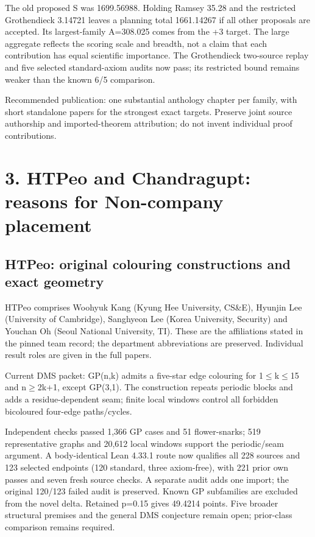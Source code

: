 \documentclass[10pt,a4paper]{article}
\begin{document}
The old proposed S was 1699.56988. Holding Ramsey 35.28 and the restricted Grothendieck 3.14721 leaves a planning total 1661.14267 if all other proposals are accepted. Its largest-family A=308.025 comes from the +3 target. The large aggregate reflects the scoring scale and breadth, not a claim that each contribution has equal scientific importance. The Grothendieck two-source replay and five selected standard-axiom audits now pass; its restricted bound remains weaker than the known 6/5 comparison.

{\small Recommended publication: one substantial anthology chapter per family, with short standalone papers for the strongest exact targets. Preserve joint source authorship and imported-theorem attribution; do not invent individual proof contributions.\par}

\clearpage
\section{3. HTPeo and Chandragupt: reasons for Non-company placement}
\subsection{HTPeo: original colouring constructions and exact geometry}
HTPeo comprises Woohyuk Kang (Kyung Hee University, CS\&E), Hyunjin Lee (University of Cambridge), Sanghyeon Lee (Korea University, Security) and Youchan Oh (Seoul National University, TI). These are the affiliations stated in the pinned team record; the department abbreviations are preserved. Individual result roles are given in the full papers.

Current DMS packet: GP(n,k) admits a five-star edge colouring for 1\ensuremath{\leq}k\ensuremath{\leq}15 and n\ensuremath{\geq}2k+1, except GP(3,1). The construction repeats periodic blocks and adds a residue-dependent seam; finite local windows control all forbidden bicoloured four-edge paths/cycles.

Independent checks passed 1,366 GP cases and 51 flower-snarks; 519 representative graphs and 20,612 local windows support the periodic/seam argument. A body-identical Lean 4.33.1 route now qualifies all 228 sources and 123 selected endpoints (120 standard, three axiom-free), with 221 prior own passes and seven fresh source checks. A separate audit adds one import; the original 120/123 failed audit is preserved. Known GP subfamilies are excluded from the novel delta. Retained p=0.15 gives 49.4214 points. Five broader structural premises and the general DMS conjecture remain open; prior-class comparison remains required.
\end{document}
